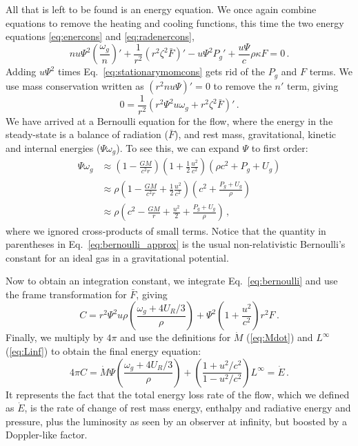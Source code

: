 \documentclass[../main.tex]{subfiles}
\begin{document}
All that is left to be found is an energy equation. We once again combine equations to remove the heating and cooling functions, this time the two energy equations \eqref{eq:enercons} and \eqref{eq:radenercons}, 
\begin{equation}
    n u\Psi^2\left(\frac{\omega_g}{n}\right)'+\frac{1}{r^2}\left(r^2\zeta^2\bar{F}\right)'-u\Psi^2P_g'+\frac{u\Psi}{c}\rho\kappa F=0\,.
\end{equation}
Adding $u\Psi^2$ times Eq.~\eqref{eq:stationarymomcons} gets rid of the $P_g$ and $F$ terms. We use mass conservation written as $(r^2nu\Psi)'=0$ to remove the $n'$ term, giving
\begin{equation}\label{eq:bernoulli}
    0=\frac{1}{r^2}\left(r^2\Psi^2u\omega_g+r^2\zeta^2\bar{F}\right)'\,.
\end{equation}
We have arrived at a Bernoulli equation for the flow, where the energy in the steady-state is a balance of radiation ($\bar{F}$), and rest mass, gravitational, kinetic and internal energies ($\Psi\omega_g$). To see this, we can expand $\Psi$ to first order:
\begin{align}
    \Psi\omega_g &\approx \left(1-\frac{GM}{c^2 r}\right)\left(1+\frac{1}{2}\frac{u^2}{c^2}\right)(\rho c^2+P_g+U_g)\nonumber\\
    &\approx \rho\left(1-\frac{GM}{c^2r}+\frac{1}{2}\frac{u^2}{c^2}\right)\left(c^2+\frac{P_g+U_g}{\rho}\right)\nonumber\\
    &\approx \rho\left(c^2-\frac{GM}{r}+\frac{u^2}{2}+\frac{P_g+U_g}{\rho}\right)\,,\label{eq:bernoulli_approx}
\end{align}
where we ignored cross-products of small terms. Notice that the quantity in parentheses in Eq.~\eqref{eq:bernoulli_approx} is the usual non-relativistic Bernoulli's constant for an ideal gas in a gravitational potential.

Now to obtain an integration constant, we integrate Eq.~\eqref{eq:bernoulli} and use the frame transformation for $\bar{F}$, giving
\begin{equation}
    C=r^2\Psi^2u\rho\left(\frac{\omega_g+4U_R/3}{\rho}\right)+\Psi^2\left(1+\frac{u^2}{c^2}\right)r^2F\,.
\end{equation}
Finally, we multiply by $4\pi$ and use the definitions for $\dot{M}$ (\ref{eq:Mdot}) and $L^\infty$ (\ref{eq:Linf}) to obtain the final energy equation:
\begin{equation}\label{eq:Edot}
    4\pi C=\boxed{\dot{M}\Psi\left(\frac{\omega_g+4U_R/3}{\rho}\right)+\left(\frac{1+u^2/c^2}{1-u^2/c^2}\right)L^\infty=\dot{E}} \,.
\end{equation}
It represents the fact that the total energy loss rate of the flow, which we defined as $\dot{E}$, is the rate of change of rest mass energy, enthalpy and radiative energy and pressure, plus the luminosity as seen by an observer at infinity, but boosted by a Doppler-like factor. 
\end{document}
